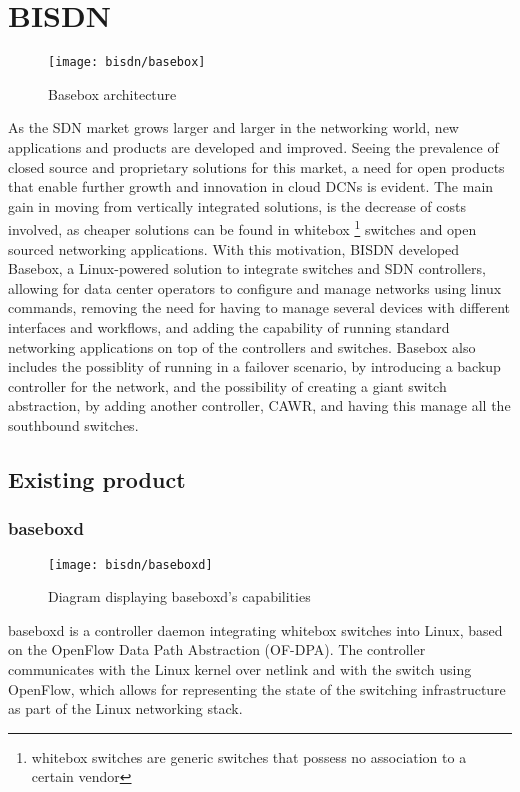 \section {BISDN} \label{chap:bisdn} %

\begin{figure} [!htbp]
    \centering
    \texttt{[image: bisdn/basebox]}
    \caption{Basebox architecture}
\end{figure}

As the SDN market grows larger and larger in the networking world, new applications and products are developed and improved. Seeing the prevalence of closed source
and proprietary solutions for this market, a need for open products that enable further growth and innovation in cloud DCNs is evident. The main gain in moving from 
vertically integrated solutions, is the decrease of costs involved, as cheaper solutions can be found in whitebox \footnote {whitebox switches are generic switches
that possess no association to a certain vendor} switches and open sourced networking applications. With this motivation, BISDN developed Basebox, a Linux-powered
solution to integrate switches and SDN controllers, allowing for data center  operators to configure and manage networks using linux commands, removing the need for
having to manage several devices with different interfaces and workflows, and adding the capability of running standard networking applications on top of the 
controllers and switches. Basebox also includes the possiblity of running in a failover scenario, by introducing a backup controller for the network, and the
possibility of creating a giant switch abstraction, by adding another controller, CAWR, and having this manage all the southbound switches.

\subsection {Existing product}

\subsubsection {baseboxd}

\begin{figure} [!htbp]
    \centering
    \texttt{[image: bisdn/baseboxd]}
    \caption{Diagram displaying baseboxd's capabilities}
\end{figure}

baseboxd is a controller daemon integrating whitebox switches into Linux, based on the OpenFlow Data Path Abstraction (OF-DPA). The controller communicates with the 
Linux kernel over netlink and with the switch using OpenFlow, which allows for representing the state of the switching infrastructure as part of the Linux networking
stack. 

